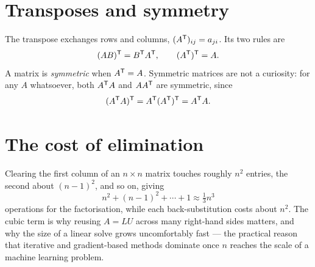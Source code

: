 \section{Transposes and symmetry}

The transpose exchanges rows and columns, \((A^{\mathsf{T}})_{ij}=a_{ji}\). Its two rules
are
\[
	(AB)^{\mathsf{T}}=B^{\mathsf{T}} A^{\mathsf{T}},
	\qquad
	(A^{\mathsf{T}})^{\mathsf{T}}=A .
\]
A matrix is \emph{symmetric} when \(A^{\mathsf{T}}=A\). Symmetric matrices are not a
curiosity: for any \(A\) whatsoever, both \(A^{\mathsf{T}} A\) and \(AA^{\mathsf{T}}\) are
symmetric, since
\[
	(A^{\mathsf{T}} A)^{\mathsf{T}}=A^{\mathsf{T}}(A^{\mathsf{T}})^{\mathsf{T}}=A^{\mathsf{T}} A .
\]


\section{The cost of elimination}

Clearing the first column of an \(n\times n\) matrix touches roughly \(n^{2}\)
entries, the second about \((n-1)^{2}\), and so on, giving
\[
	n^{2}+(n-1)^{2}+\cdots+1\approx\tfrac{1}{3}n^{3}
\]
operations for the factorisation, while each back-substitution costs about
\(n^{2}\). The cubic term is why reusing \(A=LU\) across many right-hand
sides matters, and why the size of a linear solve grows uncomfortably fast ---
the practical reason that iterative and gradient-based methods dominate once
\(n\) reaches the scale of a machine learning problem.
